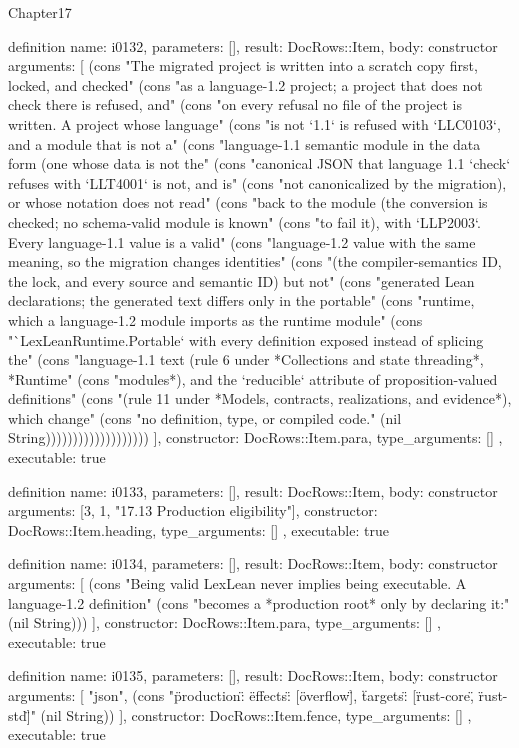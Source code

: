 \begin{lexlean}{Chapter17}
\begin{semanticmodule}
definition{
  name: i0132,
  parameters: [],
  result: DocRows::Item,
  body: constructor{
    arguments: [
      (cons "The migrated project is written into a scratch copy first, locked, and checked" (cons "as a language-1.2 project; a project that does not check there is refused, and" (cons "on every refusal no file of the project is written. A project whose language" (cons "is not `1.1` is refused with `LLC0103`, and a module that is not a" (cons "language-1.1 semantic module in the data form (one whose data is not the" (cons "canonical JSON that language 1.1 `check` refuses with `LLT4001` is not, and is" (cons "not canonicalized by the migration), or whose notation does not read" (cons "back to the module (the conversion is checked; no schema-valid module is known" (cons "to fail it), with `LLP2003`. Every language-1.1 value is a valid" (cons "language-1.2 value with the same meaning, so the migration changes identities" (cons "(the compiler-semantics ID, the lock, and every source and semantic ID) but not" (cons "generated Lean declarations; the generated text differs only in the portable" (cons "runtime, which a language-1.2 module imports as the runtime module" (cons "`LexLeanRuntime.Portable` with every definition exposed instead of splicing the" (cons "language-1.1 text (rule 6 under *Collections and state threading*, *Runtime" (cons "modules*), and the `reducible` attribute of proposition-valued definitions" (cons "(rule 11 under *Models, contracts, realizations, and evidence*), which change" (cons "no definition, type, or compiled code." (nil String)))))))))))))))))))
    ],
    constructor: DocRows::Item.para,
    type_arguments: []
  },
  executable: true
}

definition{
  name: i0133,
  parameters: [],
  result: DocRows::Item,
  body: constructor{
    arguments: [3, 1, "17.13 Production eligibility"],
    constructor: DocRows::Item.heading,
    type_arguments: []
  },
  executable: true
}

definition{
  name: i0134,
  parameters: [],
  result: DocRows::Item,
  body: constructor{
    arguments: [
      (cons "Being valid LexLean never implies being executable. A language-1.2 definition" (cons "becomes a *production root* only by declaring it:" (nil String)))
    ],
    constructor: DocRows::Item.para,
    type_arguments: []
  },
  executable: true
}

definition{
  name: i0135,
  parameters: [],
  result: DocRows::Item,
  body: constructor{
    arguments: [
      "json",
      (cons "\"production\": {\"effects\": [\"overflow\"], \"targets\": [\"rust-core\", \"rust-std\"]}" (nil String))
    ],
    constructor: DocRows::Item.fence,
    type_arguments: []
  },
  executable: true
}


\end{semanticmodule}
\end{lexlean}
